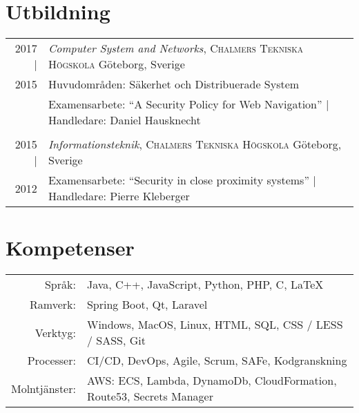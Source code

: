 \documentclass[a4paper,10pt]{scrartcl} %
\begin{document}

\section{Utbildning}

\begin{tabular}{r|p{15cm}}	
2017 |	                & \emph{Computer System and Networks}, \textsc{Chalmers Tekniska Högskola} \hfill Göteborg, Sverige \\
2015			        & \footnotesize{Huvudområden: Säkerhet och Distribuerade System} \\
\phantom{abcdefghijklm}	& \footnotesize{Examensarbete: ``A Security Policy for Web Navigation'' | Handledare: Daniel Hausknecht} \\
\multicolumn{2}{c}{} \\


2015 |      	& \emph{Informationsteknik}, \textsc{Chalmers Tekniska Högskola} \hfill Göteborg, Sverige \\
2012			& \footnotesize{Examensarbete: ``Security in close proximity systems'' | Handledare: Pierre Kleberger} \\

\end{tabular}


\section{Kompetenser}

\begin{tabular}{rp{15cm}}
\phantom{abcde} Språk: 		    & Java, C++, JavaScript, Python, PHP, C, \LaTeX \\
Ramverk:	                    & Spring Boot, Qt, Laravel \\
Verktyg:	                    & Windows, MacOS, Linux, HTML, SQL, CSS / LESS / SASS, Git \\
Processer:                      & CI/CD, DevOps, Agile, Scrum, SAFe, Kodgranskning \\
Molntjänster:                   & AWS: ECS, Lambda, DynamoDb, CloudFormation, Route53, Secrets Manager
\end{tabular}


\newpage
\end{document}
